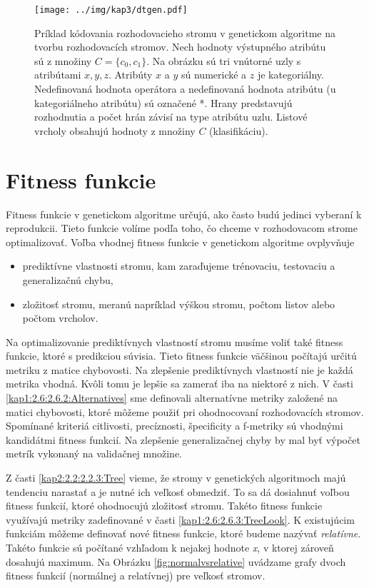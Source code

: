 \begin{figure}[h]
\centering
\centerline{\mbox{\texttt{[image: ../img/kap3/dtgen.pdf]}}}
\caption{Príklad kódovania rozhodovacieho stromu v genetickom algoritme na tvorbu rozhodovacích stromov. Nech hodnoty výstupného atribútu sú z množiny $C=\{c_0,c_1\}$. Na obrázku sú tri vnútorné uzly s atribútami $x,y,z$. Atribúty $x$ a $y$ sú numerické a $z$ je kategoriálny. Nedefinovaná hodnota operátora a nedefinovaná hodnota atribútu (u kategoriálneho atribútu) sú označené *. Hrany predstavujú rozhodnutia a počet hrán závisí na type atribútu uzlu. Listové vrcholy obsahujú hodnoty z množiny $C$ (klasifikáciu).}\label{fig:DTEncode}
\end{figure}

\section{Fitness funkcie}\label{kap3:3.3:Fitness}
Fitness funkcie v genetickom algoritme určujú, ako často budú jedinci vyberaní k reprodukcii. Tieto funkcie volíme podľa toho, čo chceme v rozhodovacom strome optimalizovať. Voľba vhodnej fitness funkcie v genetickom algoritme ovplyvňuje
\begin{itemize}
\item prediktívne vlastnosti stromu, kam zaraďujeme trénovaciu, testovaciu a generalizačnú chybu, 
\item zložitosť stromu, meranú napríklad výškou stromu, počtom listov alebo počtom vrcholov.
\end{itemize} 

Na optimalizovanie prediktívnych vlastností stromu musíme voliť také fitness funkcie, ktoré s predikciou súvisia. Tieto fitness funkcie väčšinou počítajú určitú metriku z matice chybovosti. Na zlepšenie prediktívnych vlastností nie je každá metrika vhodná. Kvôli tomu je lepšie sa zamerať iba na niektoré z nich.
V časti \ref{kap1:2.6:2.6.2:Alternatives} sme definovali alternatívne metriky založené na matici chybovosti, ktoré môžeme použiť pri ohodnocovaní rozhodovacích stromov. Spomínané kriteriá citlivosti, precíznosti, špecificity a f-metriky sú vhodnými kandidátmi fitness funkcií. Na zlepšenie generalizačnej chyby by mal byť výpočet metrík vykonaný na validačnej množine.

Z časti \ref{kap2:2.2:2.2.3:Tree} vieme, že stromy v genetických algoritmoch majú tendenciu narastať a je nutné ich veľkosť obmedziť. To sa dá dosiahnuť voľbou fitness funkcií, ktoré ohodnocujú zložitosť stromu. Takéto fitness funkcie využívajú metriky zadefinované v časti \ref{kap1:2.6:2.6.3:TreeLook}. K existujúcim funkciám môžeme definovať nové fitness funkcie, ktoré budeme nazývať \emph{relatívne}. Takéto funkcie sú počítané vzhľadom k nejakej hodnote \emph{x}, v ktorej zároveň dosahujú maximum. Na Obrázku \ref{fig:normalvsrelative} uvádzame grafy dvoch fitness funkcií (normálnej a relatívnej) pre veľkosť stromov.

